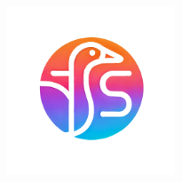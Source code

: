 \begin{titlepage}
    \newcommand{\HRule}{\rule{\linewidth}{0.5mm}}
    \center

    \vspace*{1.5cm}  %
    \begin{center}
        \includegraphics[width=5cm]{frontmatter/TS_GooseLogo.png}
    \end{center}

    \vspace{1.5cm} 



\end{titlepage}
